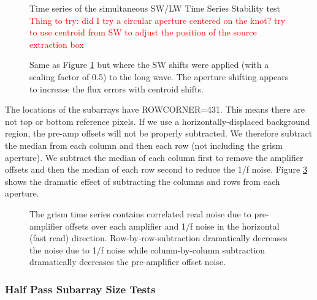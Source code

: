 \documentclass{aastex62}
\begin{document}
{\begin{figure}
\caption{Time series of the simultaneous SW/LW Time Series Stability test
\textcolor{red}{Thing to try: did I try a circular aperture centered on the knot? try to use centroid from SW to adjust the position of the source extraction box}
}\label{fig:otisLWSWtser}
\end{figure}

\begin{figure}
\caption{Same as Figure \ref{fig:otisLWSWtser} but where the SW shifts were applied (with a scaling factor of 0.5) to the long wave.
The aperture shifting appears to increase the flux errors with centroid shifts.
}\label{fig:otisLWSWtserShift}
\end{figure}



The locations of the subarrays have ROWCORNER=431.
This means there are not top or bottom reference pixels.
If we use a horizontally-displaced background region, the pre-amp offsets will not be properly subtracted.
We therefore subtract the median from each column and then each row (not including the grism aperture).
We subtract the median of each column first to remove the amplifier offsets and then the median of each row second to reduce the 1/f noise.
Figure \ref{fig:otisLWSWtserShift} shows the dramatic effect of subtracting the columns and rows from each aperture.


\begin{figure}
\caption{The grism time series contains correlated read noise due to pre-amplifier offsets over each amplifier and 1/f noise in the horizontal (fast read) direction.
Row-by-row-subtraction dramatically decreases the noise due to 1/f noise while column-by-column subtraction dramatically decreases the pre-amplifier offset noise.
}\label{fig:otisLWSWtserShift}
\end{figure}



\subsubsection{Half Pass Subarray Size Tests}

}
\end{document}
